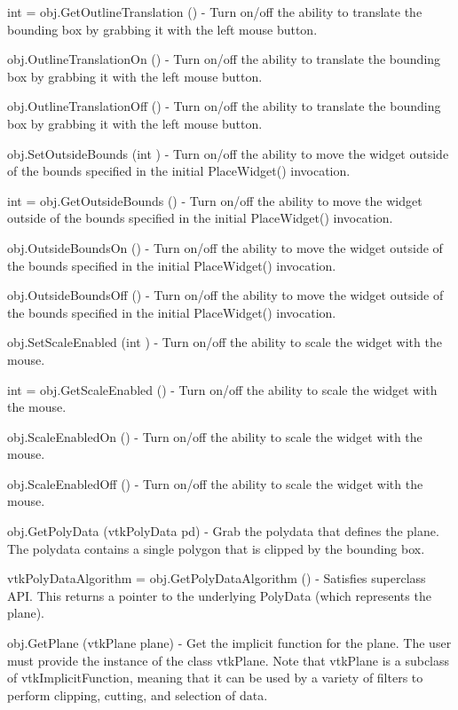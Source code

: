 \begin{DoxyItemize}
\item {\ttfamily int = obj.\-Get\-Outline\-Translation ()} -\/ Turn on/off the ability to translate the bounding box by grabbing it with the left mouse button.  
\item {\ttfamily obj.\-Outline\-Translation\-On ()} -\/ Turn on/off the ability to translate the bounding box by grabbing it with the left mouse button.  
\item {\ttfamily obj.\-Outline\-Translation\-Off ()} -\/ Turn on/off the ability to translate the bounding box by grabbing it with the left mouse button.  
\item {\ttfamily obj.\-Set\-Outside\-Bounds (int )} -\/ Turn on/off the ability to move the widget outside of the bounds specified in the initial Place\-Widget() invocation.  
\item {\ttfamily int = obj.\-Get\-Outside\-Bounds ()} -\/ Turn on/off the ability to move the widget outside of the bounds specified in the initial Place\-Widget() invocation.  
\item {\ttfamily obj.\-Outside\-Bounds\-On ()} -\/ Turn on/off the ability to move the widget outside of the bounds specified in the initial Place\-Widget() invocation.  
\item {\ttfamily obj.\-Outside\-Bounds\-Off ()} -\/ Turn on/off the ability to move the widget outside of the bounds specified in the initial Place\-Widget() invocation.  
\item {\ttfamily obj.\-Set\-Scale\-Enabled (int )} -\/ Turn on/off the ability to scale the widget with the mouse.  
\item {\ttfamily int = obj.\-Get\-Scale\-Enabled ()} -\/ Turn on/off the ability to scale the widget with the mouse.  
\item {\ttfamily obj.\-Scale\-Enabled\-On ()} -\/ Turn on/off the ability to scale the widget with the mouse.  
\item {\ttfamily obj.\-Scale\-Enabled\-Off ()} -\/ Turn on/off the ability to scale the widget with the mouse.  
\item {\ttfamily obj.\-Get\-Poly\-Data (vtk\-Poly\-Data pd)} -\/ Grab the polydata that defines the plane. The polydata contains a single polygon that is clipped by the bounding box.  
\item {\ttfamily vtk\-Poly\-Data\-Algorithm = obj.\-Get\-Poly\-Data\-Algorithm ()} -\/ Satisfies superclass A\-P\-I. This returns a pointer to the underlying Poly\-Data (which represents the plane).  
\item {\ttfamily obj.\-Get\-Plane (vtk\-Plane plane)} -\/ Get the implicit function for the plane. The user must provide the instance of the class vtk\-Plane. Note that vtk\-Plane is a subclass of vtk\-Implicit\-Function, meaning that it can be used by a variety of filters to perform clipping, cutting, and selection of data.  

\end{DoxyItemize}
